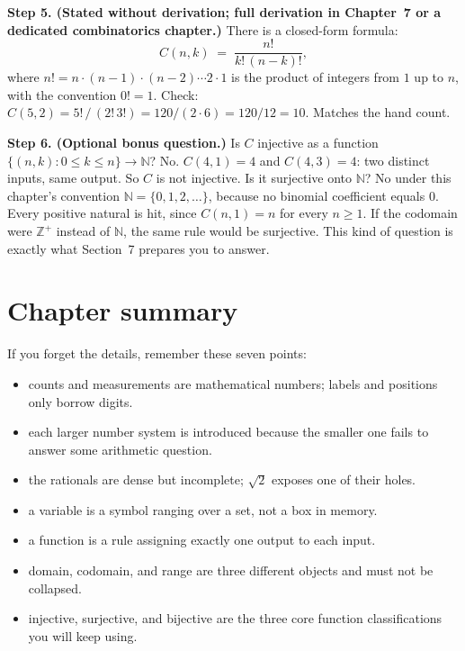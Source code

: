 \textbf{Step 5. (Stated without derivation; full derivation in Chapter~7 or a dedicated combinatorics chapter.)} There is a closed-form formula:
\[
  C(n, k) \;=\; \frac{n!}{k!\,(n-k)!},
\]
where $n! = n \cdot (n-1) \cdot (n-2) \cdots 2 \cdot 1$ is the product of integers from $1$ up to $n$, with the convention $0! = 1$. Check: $C(5, 2) = 5!\,/\,(2!\,3!) = 120/(2 \cdot 6) = 120/12 = 10$. Matches the hand count.

\textbf{Step 6. (Optional bonus question.)} Is $C$ injective as a function $\{(n, k) : 0 \leq k \leq n\} \to \mathbb{N}$? No. $C(4, 1) = 4$ and $C(4, 3) = 4$: two distinct inputs, same output. So $C$ is not injective. Is it surjective onto $\mathbb{N}$? No under this chapter's convention $\mathbb{N} = \{0,1,2,\ldots\}$, because no binomial coefficient equals $0$. Every positive natural is hit, since $C(n,1)=n$ for every $n \geq 1$. If the codomain were $\mathbb{Z}^{+}$ instead of $\mathbb{N}$, the same rule would be surjective. This kind of question is exactly what Section~7 prepares you to answer.

\section*{Chapter summary}

If you forget the details, remember these seven points:
\begin{itemize}
  \item counts and measurements are mathematical numbers; labels and positions only borrow digits.
  \item each larger number system is introduced because the smaller one fails to answer some arithmetic question.
  \item the rationals are dense but incomplete; $\sqrt{2}$ exposes one of their holes.
  \item a variable is a symbol ranging over a set, not a box in memory.
  \item a function is a rule assigning exactly one output to each input.
  \item domain, codomain, and range are three different objects and must not be collapsed.
  \item injective, surjective, and bijective are the three core function classifications you will keep using.
\end{itemize}

\newpage



